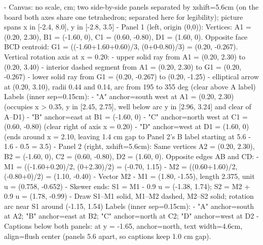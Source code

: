 \begin{proofWrapper}[Proof that \texorpdfstring{$\operatorname{Rot}(\text{Tetrahedron}) = A_4$}{Rot(Tetrahedron) = A\_4}]
\begin{content}
\begin{hidden}
- Canvas: no scale, cm; two side-by-side panels separated by xshift=5.6cm (on the board both axes share one tetrahedron; separated here for legibility); picture spans x in [-2.4, 8.0], y in [-2.8, 3.5]
- Panel 1 (left, origin (0,0)):
  Vertices: A1 = (0.20, 2.30), B1 = (-1.60, 0), C1 = (0.60, -0.80), D1 = (1.60, 0).
  Opposite face BCD centroid: G1 = ((-1.60+1.60+0.60)/3, (0+0-0.80)/3) = (0.20, -0.267).
  Vertical rotation axis at x = 0.20:
  - upper solid ray from A1 = (0.20, 2.30) to (0.20, 3.40)
  - interior dashed segment from A1 = (0.20, 2.30) to G1 = (0.20, -0.267)
  - lower solid ray from G1 = (0.20, -0.267) to (0.20, -1.25)
  - elliptical arrow at (0.20, 3.10), radii 0.44 and 0.14, arc from 195 to 355 deg (clear above A label)
  Labels (inner sep=0.15cm):
  - "A" anchor=south west at A1 = (0.20, 2.30) (occupies x > 0.35, y in [2.45, 2.75], well below arc y in [2.96, 3.24] and clear of A--D1)
  - "B" anchor=east at B1 = (-1.60, 0)
  - "C" anchor=north west at C1 = (0.60, -0.80) (clear right of axis x = 0.20)
  - "D" anchor=west at D1 = (1.60, 0) (ends around x = 2.10, leaving 1.4 cm gap to Panel 2's B label starting at 5.6 - 1.6 - 0.5 = 3.5)
- Panel 2 (right, xshift=5.6cm):
  Same vertices A2 = (0.20, 2.30), B2 = (-1.60, 0), C2 = (0.60, -0.80), D2 = (1.60, 0).
  Opposite edges AB and CD:
  - M1 = ((-1.60+0.20)/2, (0+2.30)/2) = (-0.70, 1.15)
  - M2 = ((0.60+1.60)/2, (-0.80+0)/2) = (1.10, -0.40)
  - Vector M2 - M1 = (1.80, -1.55), length 2.375, unit u = (0.758, -0.652)
  - Skewer ends: S1 = M1 - 0.9 u = (-1.38, 1.74); S2 = M2 + 0.9 u = (1.78, -0.99)
  - Draw S1--M1 solid, M1--M2 dashed, M2--S2 solid; rotation arc near S1 around (-1.15, 1.54)
  Labels (inner sep=0.15cm):
  - "A" anchor=south at A2; "B" anchor=east at B2; "C" anchor=north at C2; "D" anchor=west at D2
- Captions below both panels: at y = -1.65, anchor=north, text width=4.6cm, align=flush center (panels 5.6 apart, so captions keep 1.0 cm gap).
\end{hidden}
\begin{center}
\end{center}
\end{content}
\end{proofWrapper}
